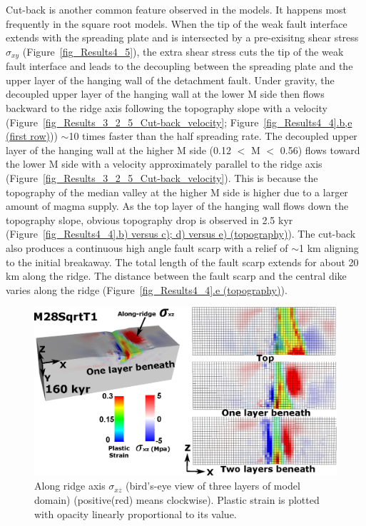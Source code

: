 Cut-back is another common feature observed in the models. It happens most frequently in the square root models. When the tip of the weak fault interface extends with the spreading plate and is intersected by a pre-exisitng shear stress $\sigma_{xy}$ (Figure~\hyperref[fig_Results4_5]{\ref{fig_Results4_5}}), the extra shear stress cuts the tip of the weak fault interface and leads to the decoupling between the spreading plate and the upper layer of the hanging wall of the detachment fault. Under gravity, the decoupled upper layer of the hanging wall at the lower M side then flows backward to the ridge axis following the topography slope with a velocity (Figure~\hyperref[fig_Results_3_2_5_Cut-back_velocity]{\ref{fig_Results_3_2_5_Cut-back_velocity}}; Figure~\hyperref[fig_Results4_4]{\ref{fig_Results4_4}.b,e (first row)})) $\sim$10 times faster than the half spreading rate. The decoupled upper layer of the hanging wall at the higher M side (0.12 $<$ M $<$ 0.56) flows toward the lower M side with a velocity approximately parallel to the ridge axis (Figure~\hyperref[fig_Results_3_2_5_Cut-back_velocity]{\ref{fig_Results_3_2_5_Cut-back_velocity}}). This is because the topography of the median valley at the higher M side is higher due to a larger amount of magma supply. As the top layer of the hanging wall flows down the topography slope, obvious topography drop is observed in 2.5 kyr (Figure~\hyperref[fig_Results4_4]{\ref{fig_Results4_4}.b) versus c); d) versus e) (topography)}). The cut-back also produces a continuous high angle fault scarp with a relief of $\sim$1 km aligning to the initial breakaway. The total length of the fault scarp extends for about 20 km along the ridge. The distance between the fault scarp and the central dike varies along the ridge (Figure~\hyperref[fig_Results4_4]{\ref{fig_Results4_4}.e (topography)}).  

\begin{figure}[h]
  \centering
    \includegraphics[width=1.0\textwidth]{./Figures/fig_Results_3_2_5_sqrt_cut_back_Sxz_beneath.eps}
  \caption{Along ridge axis $\sigma_{xz}$ (bird's-eye view of three layers of model domain) (positive(red) means clockwise). Plastic strain is plotted with opacity linearly proportional to its value.}
 \label{fig_Results_3_2_5_sqrt_cut_back_Sxz_beneath}
\end{figure}

